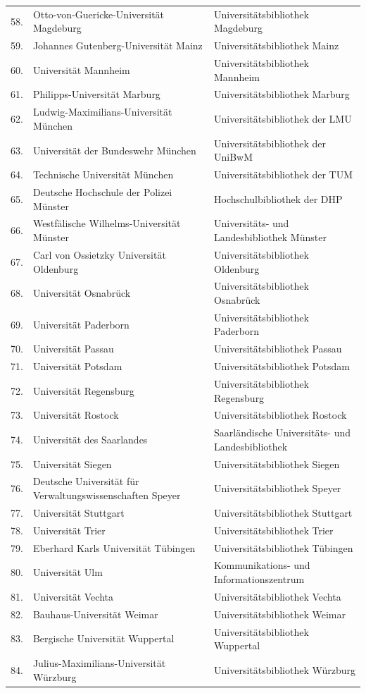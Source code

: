 \documentclass[a4paper,
fontsize=11pt,
oneside,
numbers=noperiodatend,
parskip=half-,
bibliography=totoc,
final
]{scrartcl}
\begin{document}
\begin{longtable}[l]{rp{7cm}p{7.5cm}}
58. & Otto-von-Guericke-Universität Magdeburg & Universitätsbibliothek Magdeburg \\
59. & Johannes Gutenberg-Universität Mainz & Universitätsbibliothek Mainz \\
60. & Universität Mannheim & Universitätsbibliothek Mannheim \\
61. & Philipps-Universität Marburg & Universitätsbibliothek Marburg \\
62. & Ludwig-Maximilians-Universität München & Universitätsbibliothek der LMU \\
63. & Universität der Bundeswehr München & Universitätsbibliothek der UniBwM \\
64. & Technische Universität München & Universitätsbibliothek der TUM \\
65. & Deutsche Hochschule der Polizei Münster & Hochschulbibliothek der DHP \\
66. & Westfälische Wilhelms-Universität Münster & Universitäts- und Landesbibliothek Münster \\
67. & Carl von Ossietzky Universität Oldenburg & Universitätsbibliothek Oldenburg \\
68. & Universität Osnabrück & Universitätsbibliothek Osnabrück \\
69. & Universität Paderborn & Universitätsbibliothek Paderborn \\
70. & Universität Passau & Universitätsbibliothek Passau \\
71. & Universität Potsdam & Universitätsbibliothek Potsdam \\
72. & Universität Regensburg & Universitätsbibliothek Regensburg \\
73. & Universität Rostock & Universitätsbibliothek Rostock \\
74. & Universität des Saarlandes & Saarländische Universitäts- und Landesbibliothek \\
75. & Universität Siegen & Universitätsbibliothek Siegen \\
76. & Deutsche Universität für Verwaltungswissenschaften Speyer & Universitätsbibliothek Speyer \\
77. & Universität Stuttgart & Universitätsbibliothek Stuttgart \\
78. & Universität Trier & Universitätsbibliothek Trier \\
79. & Eberhard Karls Universität Tübingen & Universitätsbibliothek Tübingen \\
80. & Universität Ulm & Kommunikations- und Informationszentrum \\
81. & Universität Vechta & Universitätsbibliothek Vechta \\
82. & Bauhaus-Universität Weimar & Universitätsbibliothek Weimar \\
83. & Bergische Universität Wuppertal & Universitätsbibliothek Wuppertal \\
84. & Julius-Maximilians-Universität Würzburg & Universitätsbibliothek Würzburg \\
\end{longtable}
\end{document}
